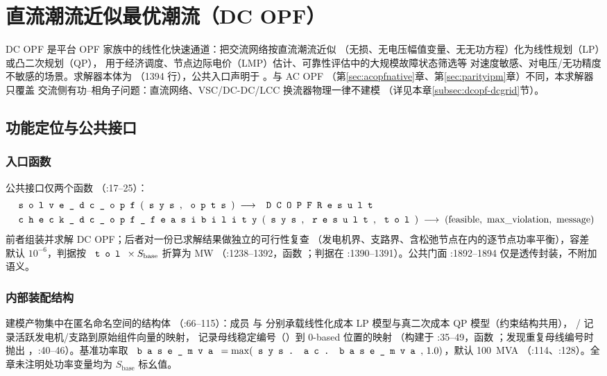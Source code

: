 \section{直流潮流近似最优潮流（DC OPF）}\label{sec:dcopf}

DC OPF 是平台 OPF 家族中的线性化快速通道：把交流网络按直流潮流近似
（无损、无电压幅值变量、无无功方程）化为线性规划（LP）或凸二次规划（QP），
用于经济调度、节点边际电价（LMP）估计、可靠性评估中的大规模故障状态筛选等
对速度敏感、对电压/无功精度不敏感的场景。求解器本体为
（1394 行），公共入口声明于
。与 AC OPF
（第\ref{sec:acopfnative}章、第\ref{sec:parityipm}章）不同，本求解器只覆盖
交流侧有功--相角子问题：直流网络、VSC/DC-DC/LCC 换流器物理一律不建模
（详见本章\ref{subsec:dcopf-dcgrid}节）。

\subsection{功能定位与公共接口}


\subsubsection*{入口函数}
公共接口仅两个函数
（:17--25）：
\begin{align*}
&\text{\srcpath{solve\_dc\_opf}(\fld{sys}, \fld{opts})} \;\longrightarrow\;
  \text{\fld{DCOPFResult}}\\
&\text{\srcpath{check\_dc\_opf\_feasibility}(\fld{sys}, \fld{result}, \fld{tol})}
  \;\longrightarrow\; (\text{feasible},\ \text{max\_violation},\ \text{message})
\end{align*}
前者组装并求解 DC OPF；后者对一份已求解结果做独立的可行性复查
（发电机界、支路界、含松弛节点在内的逐节点功率平衡），容差  默认
$10^{-6}$，判据按 $\fld{tol}\times S_{\mathrm{base}}$ 折算为 MW
（:1238--1392，函数
；判据在 :1390--1391）。公共门面
:1892--1894 仅是透传封装，不附加语义。

\subsubsection*{内部装配结构}
建模产物集中在匿名命名空间的结构体 
（:66--115）：成员  与
 分别承载线性化成本 LP 模型与真二次成本 QP 模型（约束结构共用），
/ 记录活跃发电机/支路到原始组件向量的映射，
 记录母线稳定编号（）到 0-based 位置的映射
（构建于 :35--49，函数 ；发现重复母线编号时抛出
，:40--46）。基准功率取
$\fld{base\_mva}=\max(\fld{sys.ac.base\_mva},\,1.0)$，默认 100~MVA
（:114、:128）。全章未注明处功率变量均为 $S_{\mathrm{base}}$ 标幺值。

